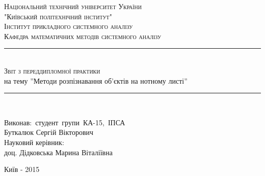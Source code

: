 \newcommand{\horrule}[1]{\rule{\linewidth}{#1}}
\begin{titlepage}
	
	\begin{center}
		\large \scshape Національний технічний університет України\\ "Київський політехнічний інститут"\\[0.5cm]
		\normalfont
		\normalsize
		Інститут прикладного системного аналізу\\
		Кафедра математичних методів системного аналізу\\
		[4.5cm]
		\normalfont 
		\horrule{0.5pt} \\[0.4cm]
		{\large \scshape Звіт з переддипломної практики}\\[0.6cm]
		на тему ''Методи розпізнавання об’єктів на нотному листі''
		\horrule{2pt} \\[3.7cm]
	\end{center}
	
	\begin{flushright}
		Виконав:~студент~групи~КА-15,~ІПСА\\
		Буткалюк Сергій Вікторович\\
		Науковий керівник:\\
		доц. Дідковська Марина Віталіївна
		\end{flushright}
	\vfill 
	\begin{center}
		{\large Київ - 2015} 
	\end{center}
	
	\thispagestyle{empty}
\end{titlepage}
\restoregeometry

